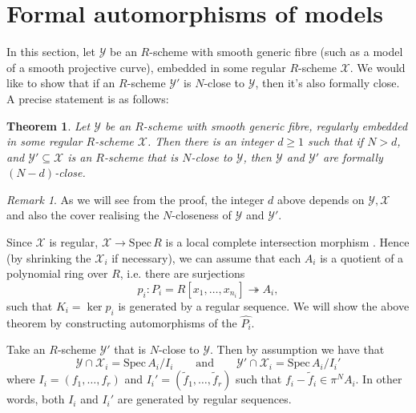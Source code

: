 \documentclass{article}
\theoremstyle{definition}
\theoremstyle{plain}
\newtheorem{thm}[defn]{Theorem}
\theoremstyle{remark}
\newtheorem{remark}[defn]{Remark}
\newcommand{\spec}{\mathrm{Spec}\,}
\newcommand{\onto}{\twoheadrightarrow}
\newcommand{\comp}[1]{\widehat{#1}}
\begin{document}
	\section{Formal automorphisms of models}\label{section_automorphisms}
	In this section, let $\mathcal{Y}$ be an $R$-scheme with smooth generic fibre (such as a model of a smooth projective curve), embedded in some regular $R$-scheme $\mathcal{X}$. We would like to show that if an $R$-scheme $\mathcal{Y}'$ is $N$-close to $\mathcal{Y}$, then it's also formally close. A precise statement is as follows:
	\begin{thm}\label{closeness_to_formal_closeness}
	Let $\mathcal{Y}$ be an $R$-scheme with smooth generic fibre, regularly embedded in some regular $R$-scheme $\mathcal{X}$. Then there is an integer $d\ge 1$ such that if $N>d$, and $\mathcal{Y}'\subseteq \mathcal{X}$ is an $R$-scheme that is $N$-close to $\mathcal{Y}$, then $\mathcal{Y}$ and $\mathcal{Y}'$ are formally $(N-d)$-close.
	\end{thm}
	\begin{remark}
		As we will see from the proof, the integer $d$ above depends on $\mathcal{Y}, \mathcal{X}$ and also the cover realising the $N$-closeness of $\mathcal{Y}$ and $\mathcal{Y}'$.
	\end{remark}
	Since $\mathcal{X}$ is regular, $\mathcal{X}\to \spec R$ is a local complete intersection morphism \cite[Example 6.3.18]{liu2002algebraic}. Hence (by shrinking the $\mathcal{X}_i$ if necessary), we can assume that each $A_i$ is a quotient of a polynomial ring over $R$, i.e. there are surjections
	\[p_i: P_i = R[x_1, \ldots, x_{n_i}]\onto A_i,\]
	such that $K_i = \ker p_i$ is generated by a regular sequence. We will show the above theorem by constructing automorphisms of the $\comp{P_i}$. 
	
	Take an $R$-scheme $\mathcal{Y}'$ that is $N$-close to $\mathcal{Y}$. Then by assumption we have that
	\[\mathcal{Y}\cap \mathcal{X}_i = \spec A_i/I_i\qquad\text{and}\qquad\mathcal{Y}'\cap \mathcal{X}_i = \spec A_i/I_i'\]
	where $I_i = (f_1, \ldots, f_r)$ and $I_i' = (\widetilde{f}_1, \ldots, \widetilde{f}_r)$ such that $f_i-\widetilde{f}_i\in \pi^NA_i$. In other words, both $I_i$ and $I_i'$ are generated by regular sequences.
	
\end{document}

